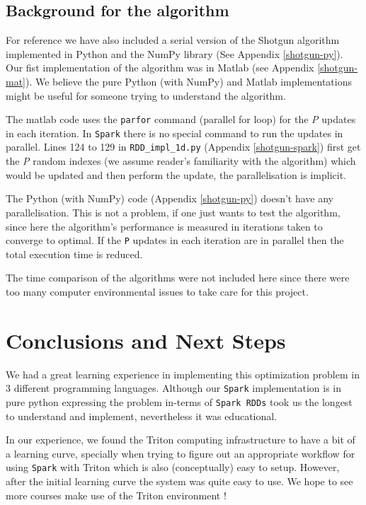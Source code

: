 \documentclass[a4paper,11pt]{article}
\begin{document}
\subsection{Background for the algorithm}
For reference we have also included a serial version of the Shotgun algorithm implemented in Python and the NumPy library (See Appendix \ref{shotgun-py}). Our fist implementation of the algorithm was in Matlab (see Appendix \ref{shotgun-mat}). We believe the pure Python (with NumPy) and Matlab implementations might be useful for someone trying to understand the algorithm.\par
The matlab code uses the \texttt{parfor} command (parallel for loop) for the \textit{P} updates in each iteration. In \texttt{Spark} there is no special command to run the updates in parallel. Lines 124 to 129 in \texttt{RDD\_impl\_1d.py} (Appendix \ref{shotgun-spark}) first get the \textit{P} random indexes (we assume reader's familiarity with the algorithm) which would be updated and then perform the update, the parallelisation is implicit.\par
The Python (with NumPy) code (Appendix \ref{shotgun-py}) doesn't have any parallelisation. This is not a problem, if one just wants to test the algorithm, since here the algorithm's performance is measured in iterations taken to converge to optimal. If the \texttt{P} updates in each iteration are in parallel then the total execution time is reduced.

The time comparison of the algorithms were not included here since there were too many computer environmental issues to take care for this project. 

\section{Conclusions and Next Steps}

We had a great learning experience in implementing this optimization problem in 3 different programming languages. Although our \texttt{Spark} implementation is in pure python expressing the problem in-terms of \texttt{Spark RDDs} took us the longest to understand and implement, nevertheless it was educational. \par

In our experience, we found the Triton computing infrastructure to have a bit of a learning curve, specially when trying to figure out an appropriate workflow for using \texttt{Spark} with Triton which is also (conceptually) easy to setup. However, after the initial learning curve the system was quite easy to use. We hope to see more courses make use of the Triton environment !\par
\end{document}
